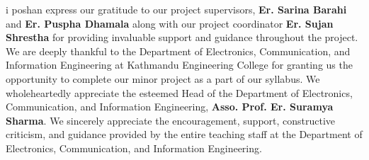 i poshan  express our gratitude to our project supervisors, \textbf{Er. Sarina Barahi} and \textbf{Er. Puspha Dhamala} along with our project coordinator\textbf{ Er. Sujan Shrestha} for providing invaluable support and guidance throughout the project. We are deeply thankful to the Department of Electronics, Communication, and Information Engineering at Kathmandu Engineering College for granting us the opportunity to complete our minor project as a part of our syllabus. We wholeheartedly appreciate the esteemed Head of the Department of Electronics, Communication, and Information Engineering, \textbf{Asso. Prof. Er. Suramya Sharma}. We sincerely appreciate the encouragement, support, constructive criticism, and guidance provided by the entire teaching staff at the Department of Electronics, Communication, and Information Engineering.